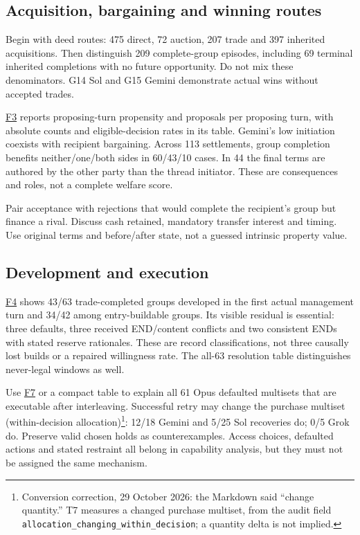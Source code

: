 \subsection{Acquisition, bargaining and winning routes}
Begin with deed routes: 475 direct, 72 auction, 207 trade and 397 inherited acquisitions. Then distinguish 209 complete-group episodes, including 69 terminal inherited completions with no future opportunity. Do not mix these denominators. G14 Sol and G15 Gemini demonstrate actual wins without accepted trades.

\href{run:../astra/exhibits/f03_negotiation_profiles.png}{F3} reports proposing-turn propensity and proposals per proposing turn, with absolute counts and eligible-decision rates in its table. Gemini's low initiation coexists with recipient bargaining. Across 113 settlements, group completion benefits neither/one/both sides in 60/43/10 cases. In 44 the final terms are authored by the other party than the thread initiator. These are consequences and roles, not a complete welfare score.

Pair acceptance with rejections that would complete the recipient's group but finance a rival. Discuss cash retained, mandatory transfer interest and timing. Use original terms and before/after state, not a guessed intrinsic property value.

\subsection{Development and execution}
\href{run:../astra/exhibits/f04_opportunity_and_deployment.png}{F4} shows 43/63 trade-completed groups developed in the first actual management turn and 34/42 among entry-buildable groups. Its visible residual is essential: three defaults, three received END/content conflicts and two consistent ENDs with stated reserve rationales. These are record classifications, not three causally lost builds or a repaired willingness rate. The all-63 resolution table distinguishes never-legal windows as well.

Use \href{run:../astra/exhibits/f07_build_recovery.png}{F7} or a compact table to explain all 61 Opus defaulted multisets that are executable after interleaving. Successful retry may change the purchase multiset (within-decision allocation)\footnote{Conversion correction, 29 October 2026: the Markdown said ``change quantity.'' T7 measures a changed purchase multiset, from the audit field \texttt{allocation\_changing\_within\_decision}; a quantity delta is not implied.}: 12/18 Gemini and 5/25 Sol recoveries do; 0/5 Grok do. Preserve valid chosen holds as counterexamples. Access choices, defaulted actions and stated restraint all belong in capability analysis, but they must not be assigned the same mechanism.

